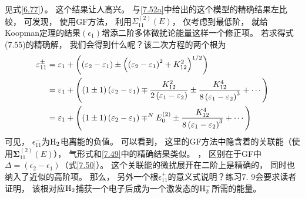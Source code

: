 见式\eqref{6.77}）。
这个结果让人高兴。
与\eqref{7.52a}中给出的这个模型的精确结果左比较，
可发现，
使用GF方法，
利用$\Sigma_{11}^{(2)}(E)$，
仅考虑到最低阶，
就给Koopman定理的结果$(\epsilon_1)$增添二阶多体微扰论能量这样一个修正项。
若求得式(7.55)的精确解，
我们会得到什么呢？该二次方程的两个根为
\begin{align}
\varepsilon_{11}^{\pm} &=\varepsilon_{1}+\left(\left(\varepsilon_{2}-\varepsilon_{1}\right) \pm\left(\left(\varepsilon_{2}-\varepsilon_{1}\right)^{2}+K_{12}^{2}\right)^{1 / 2}\right) \notag\\
&=\varepsilon_{1}+\left((1 \pm 1)\left(\varepsilon_{2}-\varepsilon_{1}\right) \mp \frac{K_{12}^{2}}{2\left(\varepsilon_{1}-\varepsilon_{2}\right)} \pm \frac{K_{12}^{4}}{8\left(\varepsilon_{1}-\varepsilon_{2}\right)^{3}}+\cdots\right) \notag\\
	&=\varepsilon_{1}+\left((1 \pm 1)\left(\varepsilon_{2}-\varepsilon_{1}\right) \mp^{N} E_{0}^{(2)} \pm \frac{K_{12}^{4}}{8\left(\varepsilon_{1}-\varepsilon_{2}\right)^{3}}+\cdots\right) \label{7.57}
\end{align}
可见，
$\epsilon_{11}^-$为$\mathrm{H}_2$电离能的负值。
可以看到，
这里的GF方法中隐含着的关联能（使用$\mathbf{\Sigma}_{11}^{(2)}(E)$），
气形式和\eqref{7.49}中的精确结果类似。
，
区别在于GF中$\Delta=(\epsilon_{2}-\epsilon_1)$（式\eqref{7.50}）。
这个关联能的微扰展开在二阶上是精确的，
同时也纳入了近似的高阶项。
那么，
另外一个根$\epsilon_{11}^+$的意义式说明？练习7.
9会要求读者证明，
该根对应$\mathrm{H}_2$捕获一个电子后成为一个激发态的$\mathrm{H}_2^-$所需的能量。

